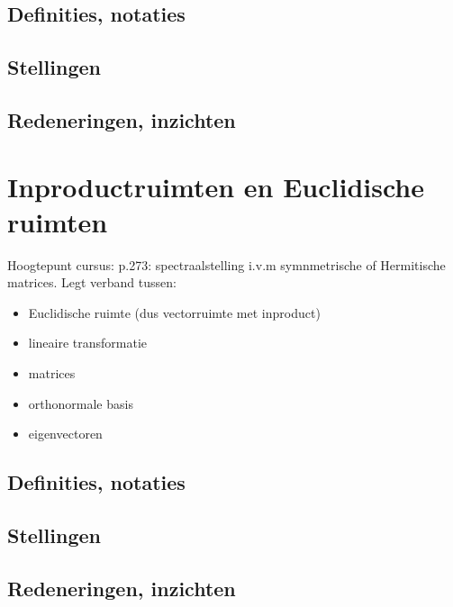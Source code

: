 \documentclass{article}
\begin{document}
\subsection{Definities, notaties}

\subsection{Stellingen}

\subsection{Redeneringen, inzichten}





\section{Inproductruimten en Euclidische ruimten}



Hoogtepunt cursus: p.273: spectraalstelling i.v.m symnmetrische of Hermitische matrices. 
Legt verband tussen: 

\begin{itemize}
    \item Euclidische ruimte (dus vectorruimte met inproduct)
    \item lineaire transformatie
    \item matrices
    \item orthonormale basis
    \item eigenvectoren
\end{itemize}


\subsection{Definities, notaties}

\subsection{Stellingen}

\subsection{Redeneringen, inzichten}
\end{document}
